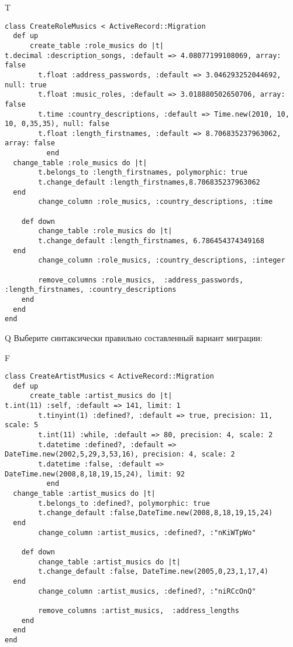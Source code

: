 T
\begin{verbatim}
class CreateRoleMusics < ActiveRecord::Migration
  def up
	  create_table :role_musics do |t|
t.decimal :description_songs, :default => 4.08077199108069, array: false
		t.float :address_passwords, :default => 3.046293252044692, null: true
		t.float :music_roles, :default => 3.018880502650706, array: false
		t.time :country_descriptions, :default => Time.new(2010, 10, 10, 0,35,35), null: false
		t.float :length_firstnames, :default => 8.706835237963062, array: false
		  end
  change_table :role_musics do |t|
		t.belongs_to :length_firstnames, polymorphic: true
 		t.change_default :length_firstnames,8.706835237963062
  end
 		change_column :role_musics, :country_descriptions, :time
   
	def down
		change_table :role_musics do |t|
		t.change_default :length_firstnames, 6.786454374349168
  end
 		change_column :role_musics, :country_descriptions, :integer
   
		remove_columns :role_musics,  :address_passwords, :length_firstnames, :country_descriptions 
    end 
  end
end

\end{verbatim}

Q
Выберите синтаксически правильно составленный вариант миграции:

F
\begin{verbatim}
class CreateArtistMusics < ActiveRecord::Migration
  def up
	  create_table :artist_musics do |t|
t.int(11) :self, :default => 141, limit: 1
		t.tinyint(1) :defined?, :default => true, precision: 11, scale: 5
		t.int(11) :while, :default => 80, precision: 4, scale: 2
		t.datetime :defined?, :default => DateTime.new(2002,5,29,3,53,16), precision: 4, scale: 2
		t.datetime :false, :default => DateTime.new(2008,8,18,19,15,24), limit: 92
		  end
  change_table :artist_musics do |t|
		t.belongs_to :defined?, polymorphic: true
 		t.change_default :false,DateTime.new(2008,8,18,19,15,24)
  end
 		change_column :artist_musics, :defined?, :"nKiWTpWo"
   
	def down
		change_table :artist_musics do |t|
		t.change_default :false, DateTime.new(2005,0,23,1,17,4)
  end
 		change_column :artist_musics, :defined?, :"niRCcOnQ"
   
		remove_columns :artist_musics,  :address_lengths 
    end 
  end
end

\end{verbatim}

